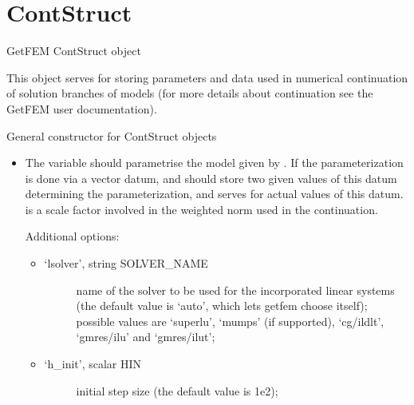 \documentclass[a4paper,11pt,english]{sphinxmanual}
\begin{document}
\section{ContStruct}
\label{\detokenize{python/cmdref_ContStruct:contstruct}}\label{\detokenize{python/cmdref_ContStruct::doc}}

\begin{fulllineitems}
\label{\detokenize{python/cmdref_ContStruct:getfem.ContStruct}}
GetFEM ContStruct object

This object serves for storing parameters and data used in numerical
continuation of solution branches of models (for more details about
continuation see the GetFEM user documentation).

General constructor for ContStruct objects
\begin{itemize}
\item {} 
The variable  should parametrise the model given by
. If the parameterization is done via a vector datum, 
and  should store two given values of this datum
determining the parameterization, and  serves for actual
values of this datum.  is a scale factor involved in the weighted
norm used in the continuation.

Additional options:
\begin{itemize}
\item {} \begin{description}
\item[{‘lsolver’, string SOLVER\_NAME}] \leavevmode
name of the solver to be used for the incorporated linear systems
(the default value is ‘auto’, which lets getfem choose itself);
possible values are ‘superlu’, ‘mumps’ (if supported), ‘cg/ildlt’,
‘gmres/ilu’ and ‘gmres/ilut’;

\end{description}

\item {} \begin{description}
\item[{‘h\_init’, scalar HIN}] \leavevmode
initial step size (the default value is 1e\sphinxhyphen{}2);


\end{description}
\end{itemize}
\end{itemize}
\end{fulllineitems}
\end{document}
